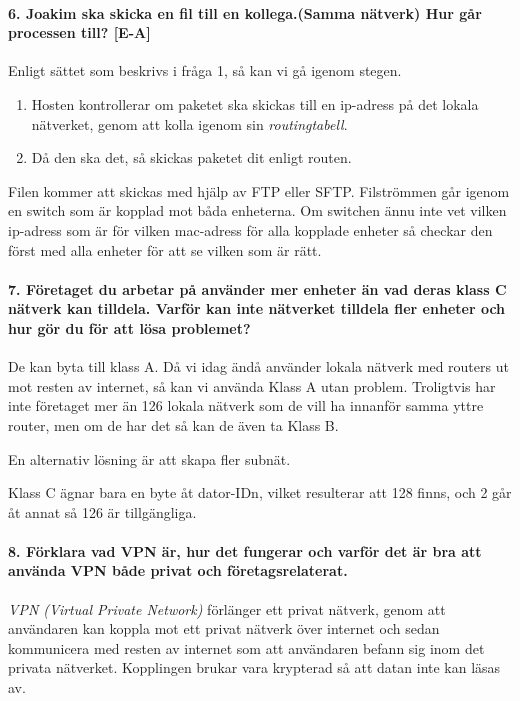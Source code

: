 \paragraph{6. Joakim ska skicka en fil till en kollega.(Samma nätverk) Hur går processen till? [E-A]}

Enligt sättet som beskrivs i fråga 1, så kan vi gå igenom stegen.

\begin{enumerate}
	\item Hosten kontrollerar om paketet ska skickas till en ip-adress på det lokala nätverket, genom att kolla igenom sin \textit{routingtabell}.
	\item Då den ska det, så skickas paketet dit enligt routen.
\end{enumerate}

Filen kommer att skickas med hjälp av FTP eller SFTP. Filströmmen går igenom en switch som är kopplad mot båda enheterna. Om switchen ännu inte vet vilken ip-adress som är för vilken mac-adress för alla kopplade enheter så checkar den först med alla enheter för att se vilken som är rätt.

\paragraph{7. Företaget du arbetar på använder mer enheter än vad deras klass C nätverk kan tilldela. Varför kan inte nätverket tilldela fler enheter och hur gör du för att lösa problemet?}

De kan byta till klass A. Då vi idag ändå använder lokala nätverk med routers ut mot resten av internet, så kan vi använda Klass A utan problem. Troligtvis har inte företaget mer än 126 lokala nätverk som de vill ha innanför samma yttre router, men om de har det så kan de även ta Klass B.

En alternativ lösning är att skapa fler subnät.

Klass C ägnar bara en byte åt dator-IDn, vilket resulterar att 128 finns, och 2 går åt annat så 126 är tillgängliga.

\paragraph{8. Förklara vad VPN är, hur det fungerar och varför det är bra att använda VPN både privat och företagsrelaterat.}

\textit{VPN (Virtual Private Network)} förlänger ett privat nätverk, genom att användaren kan koppla mot ett privat nätverk över internet och sedan kommunicera med resten av internet som att användaren befann sig inom det privata nätverket. Kopplingen brukar vara krypterad så att datan inte kan läsas av.

